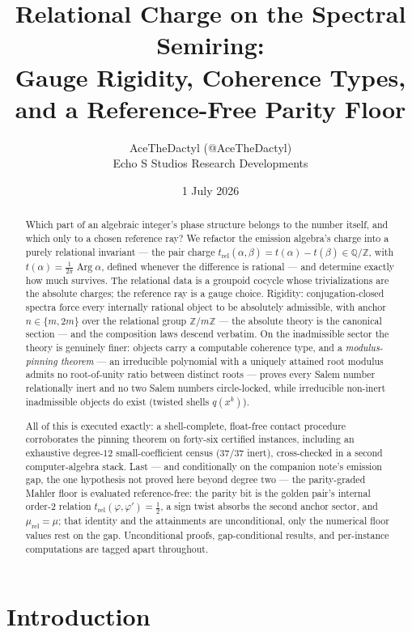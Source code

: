 \documentclass[11pt]{article}
\title{Relational Charge on the Spectral Semiring:\\
Gauge Rigidity, Coherence Types, and a Reference-Free Parity Floor}
\author{AceTheDactyl (@AceTheDactyl)\\ Echo S Studios Research Developments}
\date{1 July 2026}
\theoremstyle{plain}
\theoremstyle{definition}
\theoremstyle{remark}
\newcommand{\Q}{\mathbb{Q}}
\newcommand{\Z}{\mathbb{Z}}
\DeclareMathOperator{\Arg}{Arg}
\begin{document}
\maketitle

\begin{abstract}
Which part of an algebraic integer's phase structure belongs to the number
itself, and which only to a chosen reference ray? We refactor the emission
algebra's charge into a purely relational invariant --- the pair charge
$t_{\mathrm{rel}}(\alpha,\beta)=t(\alpha)-t(\beta)\in\Q/\Z$, with
$t(\alpha)=\frac{1}{2\pi}\Arg\alpha$, defined whenever the difference is
rational --- and determine exactly how much
survives. The relational data is a groupoid cocycle whose trivializations
are the absolute charges; the reference ray is a gauge choice. Rigidity:
conjugation-closed spectra force every internally rational object to be
absolutely admissible, with anchor $n\in\{m,2m\}$ over the relational group
$\Z/m\Z$ --- the absolute theory is the canonical section --- and the
composition laws descend verbatim. On the inadmissible sector the theory is
genuinely finer: objects carry a computable coherence type, and a
\emph{modulus-pinning theorem} --- an irreducible polynomial with a
uniquely attained root modulus admits no root-of-unity ratio between
distinct roots --- proves every Salem number relationally inert and no two
Salem numbers circle-locked, while irreducible non-inert inadmissible
objects do exist (twisted shells $q(x^k)$).

All of this is executed exactly: a shell-complete, float-free contact
procedure corroborates the pinning theorem on forty-six certified
instances, including an exhaustive degree-$12$ small-coefficient census
($37/37$ inert), cross-checked in a second computer-algebra stack. Last ---
and conditionally on the companion note's emission gap, the one hypothesis
not proved here beyond degree two --- the parity-graded Mahler floor is
evaluated reference-free: the parity bit is the golden pair's internal
order-$2$ relation $t_{\mathrm{rel}}(\varphi,\varphi')=\tfrac12$, a sign
twist absorbs the second anchor sector, and
$\mu_{\mathrm{rel}}=\mu$; that identity and the attainments are
unconditional, only the numerical floor values rest on the gap.
Unconditional proofs, gap-conditional results, and per-instance
computations are tagged apart throughout.
\end{abstract}

\section{Introduction}
\end{document}

